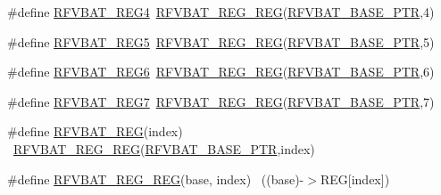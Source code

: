 \begin{DoxyCompactItemize}
\item 
\#define \hyperlink{group___r_f_v_b_a_t___register___accessor___macros_ga94341c77e156361945ba570c7cf9d02a}{R\+F\+V\+B\+A\+T\+\_\+\+R\+E\+G4}~\hyperlink{group___r_f_v_b_a_t___register___accessor___macros_ga8c8b6cb4ceddcf6be9717e473a265aba}{R\+F\+V\+B\+A\+T\+\_\+\+R\+E\+G\+\_\+\+R\+EG}(\hyperlink{group___r_f_v_b_a_t___peripheral_ga5b6418d9be20f84b2190ccf6134b7ba3}{R\+F\+V\+B\+A\+T\+\_\+\+B\+A\+S\+E\+\_\+\+P\+TR},4)
\item 
\#define \hyperlink{group___r_f_v_b_a_t___register___accessor___macros_ga59735a620ffb54ec36ce0b413be0ac35}{R\+F\+V\+B\+A\+T\+\_\+\+R\+E\+G5}~\hyperlink{group___r_f_v_b_a_t___register___accessor___macros_ga8c8b6cb4ceddcf6be9717e473a265aba}{R\+F\+V\+B\+A\+T\+\_\+\+R\+E\+G\+\_\+\+R\+EG}(\hyperlink{group___r_f_v_b_a_t___peripheral_ga5b6418d9be20f84b2190ccf6134b7ba3}{R\+F\+V\+B\+A\+T\+\_\+\+B\+A\+S\+E\+\_\+\+P\+TR},5)
\item 
\#define \hyperlink{group___r_f_v_b_a_t___register___accessor___macros_ga8f932612a87a5a7e302b4990c3880b03}{R\+F\+V\+B\+A\+T\+\_\+\+R\+E\+G6}~\hyperlink{group___r_f_v_b_a_t___register___accessor___macros_ga8c8b6cb4ceddcf6be9717e473a265aba}{R\+F\+V\+B\+A\+T\+\_\+\+R\+E\+G\+\_\+\+R\+EG}(\hyperlink{group___r_f_v_b_a_t___peripheral_ga5b6418d9be20f84b2190ccf6134b7ba3}{R\+F\+V\+B\+A\+T\+\_\+\+B\+A\+S\+E\+\_\+\+P\+TR},6)
\item 
\#define \hyperlink{group___r_f_v_b_a_t___register___accessor___macros_gadfbd3389e8e352e6fa869c5637131038}{R\+F\+V\+B\+A\+T\+\_\+\+R\+E\+G7}~\hyperlink{group___r_f_v_b_a_t___register___accessor___macros_ga8c8b6cb4ceddcf6be9717e473a265aba}{R\+F\+V\+B\+A\+T\+\_\+\+R\+E\+G\+\_\+\+R\+EG}(\hyperlink{group___r_f_v_b_a_t___peripheral_ga5b6418d9be20f84b2190ccf6134b7ba3}{R\+F\+V\+B\+A\+T\+\_\+\+B\+A\+S\+E\+\_\+\+P\+TR},7)
\item 
\#define \hyperlink{group___r_f_v_b_a_t___register___accessor___macros_ga73d57e05c3f341bac06fd7fdc7adb216}{R\+F\+V\+B\+A\+T\+\_\+\+R\+EG}(index)                                            ~\hyperlink{group___r_f_v_b_a_t___register___accessor___macros_ga8c8b6cb4ceddcf6be9717e473a265aba}{R\+F\+V\+B\+A\+T\+\_\+\+R\+E\+G\+\_\+\+R\+EG}(\hyperlink{group___r_f_v_b_a_t___peripheral_ga5b6418d9be20f84b2190ccf6134b7ba3}{R\+F\+V\+B\+A\+T\+\_\+\+B\+A\+S\+E\+\_\+\+P\+TR},index)
\item 
\#define \hyperlink{group___r_f_v_b_a_t___register___accessor___macros_ga8c8b6cb4ceddcf6be9717e473a265aba}{R\+F\+V\+B\+A\+T\+\_\+\+R\+E\+G\+\_\+\+R\+EG}(base,  index)                          ~((base)-\/$>$R\+EG\mbox{[}index\mbox{]})

\end{DoxyCompactItemize}
